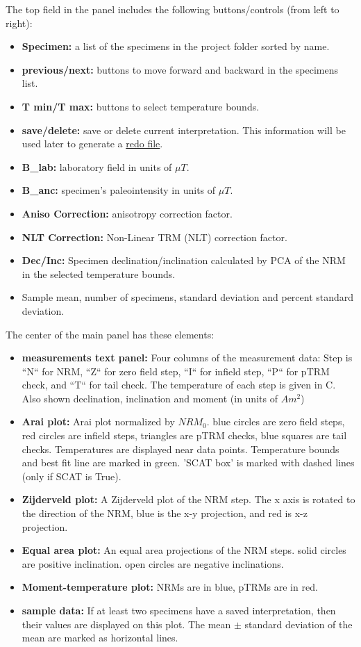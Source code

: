 \documentclass[11pt]{book}
\begin{document}
{{\noindent
  The top field in the  panel includes the following buttons/controls (from left to right):
  \begin{itemize}
\item {\bf Specimen:} a list of the specimens in the project folder sorted by name.
\item {\bf previous/next:} buttons to move forward and backward in the specimens list.
\item {\bf T min/T max:} buttons to select temperature bounds.
\item {\bf save/delete:} save or delete current interpretation. This information will be used later to generate a \href{#mk_redo.py}{redo file}.
\item {\bf B\_lab:} laboratory field in units of $\mu T$.
\item {\bf B\_anc:} specimen's paleointensity in units of $\mu T$.
\item {\bf Aniso Correction:} anisotropy correction factor.
\item {\bf NLT Correction:} Non-Linear TRM (NLT) correction factor.
\item {\bf Dec/Inc:} Specimen declination/inclination calculated by PCA of the NRM in the selected temperature bounds.
\item Sample mean, number of specimens, standard deviation and percent standard deviation.
\end{itemize}

The center of the main panel has these elements:

\begin{itemize}
\item {\bf measurements text panel:} Four columns of the measurement data: Step is ``N`` for NRM, ``Z`` for zero field step, ``I`` for infield step, ``P`` for pTRM check, and ``T`` for tail check. The temperature of each step is given in C. Also shown  declination, inclination and moment (in units of $Am^2$)
\item {\bf Arai plot:}  Arai plot normalized by $NRM_0$. blue circles are zero field steps, red circles are infield steps, triangles are pTRM checks, blue squares are tail checks. Temperatures are displayed near data points. Temperature bounds and best fit line are marked in green. 'SCAT box' is marked with dashed lines (only if SCAT is True).
\item {\bf Zijderveld plot:}  A Zijderveld plot of the NRM step.  The x axis is rotated to the direction of the NRM, blue is the x-y  projection, and red is x-z projection.
\item {\bf Equal area plot:}  An equal area projections  of the NRM steps. solid circles are positive inclination. open circles are negative inclinations.
\item {\bf Moment-temperature plot:}  NRMs are in blue, pTRMs are in red.
\item {\bf sample data:}  If at least two specimens have a saved interpretation, then their values are displayed on this plot. The mean $\pm$ standard deviation of the mean are marked as  horizontal lines.
\end{itemize}

}}
\end{document}

